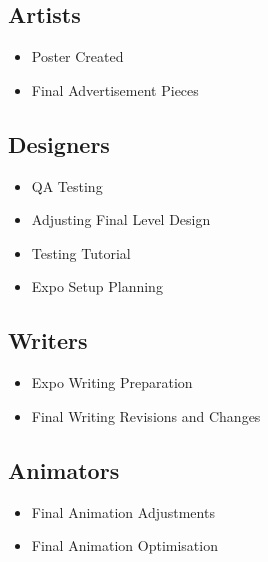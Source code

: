 \documentclass{article}
\begin{document}
\subsection{Artists}
\begin{itemize}
    \item Poster Created
    \item Final Advertisement Pieces
\end{itemize}

\subsection{Designers}
\begin{itemize}
    \item QA Testing
    \item Adjusting Final Level Design
    \item Testing Tutorial
    \item Expo Setup Planning
\end{itemize}

\subsection{Writers}
\begin{itemize}
    \item Expo Writing Preparation
    \item Final Writing Revisions and Changes
\end{itemize}

\subsection{Animators}
\begin{itemize}
    \item Final Animation Adjustments
    \item Final Animation Optimisation
\end{itemize}
\end{document}
